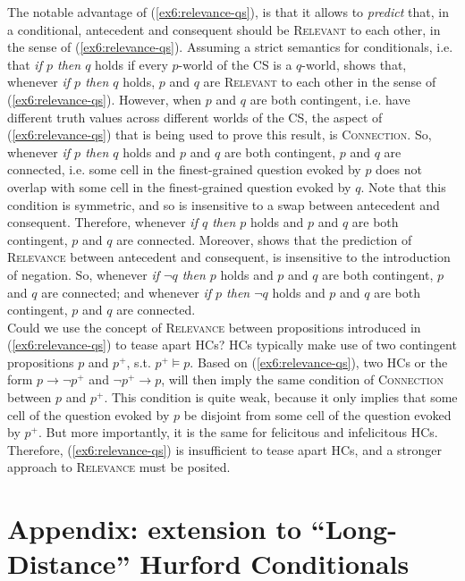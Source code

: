 The notable advantage of (\ref{ex6:relevance-qs}), is that it allows to \textit{predict} that, in a conditional, antecedent and consequent should be \textsc{Relevant} to each other, in the sense of (\ref{ex6:relevance-qs}). Assuming a strict semantics for conditionals, i.e. that \textit{if $p$ then $q$} holds if every $p$-world of the CS is a $q$-world, \citeauthor*{Lewis1988} shows that, whenever \textit{if $p$ then $q$} holds, $p$ and $q$ are \textsc{Relevant} to each other in the sense of (\ref{ex6:relevance-qs}). However, when $p$ and $q$ are both contingent, i.e. have different truth values across different worlds of the CS, the aspect of (\ref{ex6:relevance-qs}) that is being used to prove this result, is \textsc{Connection}. So, whenever \textit{if $p$ then $q$} holds and $p$ and $q$ are both contingent, $p$ and $q$ are connected, i.e. some cell in the finest-grained question evoked by $p$ does not overlap with some cell in the finest-grained question evoked by $q$. Note that this condition is symmetric, and so is insensitive to a swap between antecedent and consequent. Therefore, whenever \textit{if $q$ then $p$} holds and $p$ and $q$ are both contingent, $p$ and $q$ are connected. Moreover, \citeauthor*{Lewis1988} shows that the prediction of \textsc{Relevance} between antecedent and consequent, is insensitive to the introduction of negation. So, whenever \textit{if $\neg q$ then $p$} holds and $p$ and $q$ are both contingent, $p$ and $q$ are connected; and whenever \textit{if $p$ then $\neg q$} holds and $p$ and $q$ are both contingent, $p$ and $q$ are connected.\\

Could we use the concept of \textsc{Relevance} between propositions introduced in (\ref{ex6:relevance-qs}) to tease apart HCs? HCs typically make use of two contingent propositions $p$ and $p^+$, s.t. $p^+ \vDash p$. Based on (\ref{ex6:relevance-qs}), two HCs or the form $p \rightarrow \neg p^+$ and $\neg p^+ \rightarrow p$, will then imply the same condition of \textsc{Connection} between $p$ and $p^+$. This condition is quite weak, because it only implies that some cell of the question evoked by $p$ be disjoint from some cell of the question evoked by $p^+$. But more importantly, it is the same for felicitous and infelicitous HCs. Therefore,  (\ref{ex6:relevance-qs}) is insufficient to tease apart HCs, and a stronger approach to \textsc{Relevance} must be posited. 

\section{Appendix: extension to ``Long-Distance'' Hurford Conditionals}\label{sec6:ldhc}

